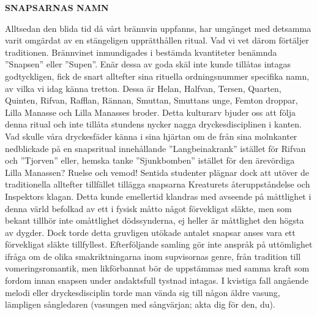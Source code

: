 \begin{intersong}

\textbf{SNAPSARNAS NAMN}

\begin{small}
Alltsedan den blida tid då vårt brännvin uppfanns, har umgänget med detsamma varit omgärdat av en stängeligen upprätthållen ritual. Vad vi vet därom förtäljer traditionen. Brännvinet inmundigades i bestämda kvantiteter benämnda ''Snapsen'' eller ''Supen''. Enär dessa av goda skäl inte kunde tillåtas intagas godtyckligen, fick de snart alltefter sina rituella ordningsnummer specifika namn, av vilka vi idag känna tretton. Dessa är Helan, Halfvan, Tersen, Quarten, Quinten, Rifvan, Rafflan, Rännan, Smuttan, Smuttans unge, Femton droppar, Lilla Manasse och Lilla Manasses broder. Detta kulturarv bjuder oss att följa denna ritual och inte tillåta stundens nycker nagga dryckesdisciplinen i kanten. Vad skulle våra dryckesfäder känna i sina hjärtan om de från sina molnkanter nedblickade på en snapsritual innehållande ''Langbeinakrank'' istället för Rifvan och ''Tjorven'' eller, hemska tanke ''Sjunkbomben'' istället för den ärevördiga Lilla Manassen? Ruelse och vemod! Sentida studenter plägnar dock att utöver de traditionella alltefter tillfället tillägga snapsarna Kreaturets återuppståndelse och Inspektors klagan. Detta kunde emellertid klandras med avseende på måttlighet i denna värld befolkad av ett i fysisk måtto något förvekligat släkte, men som bekant tillhör inte omåttlighet dödssynderna, ej heller är måttlighet den högsta av dygder. Dock torde detta gruvligen utökade antalet snapsar anses vara ett förvekligat släkte tillfyllest. Efterföljande samling gör inte anspråk på uttömlighet ifråga om de olika smakriktningarna inom supvisornas genre, från tradition till vomeringsromantik, men likförbannat bör de uppstämmas med samma kraft som fordom innan snapsen under andaktsfull tystnad intagas. I kvistiga fall angående melodi eller dryckesdisciplin torde man vända sig till någon äldre vasung, lämpligen sångledaren (vasungen med sångvärjan; akta dig för den, du).
\end{small}

\end{intersong}

